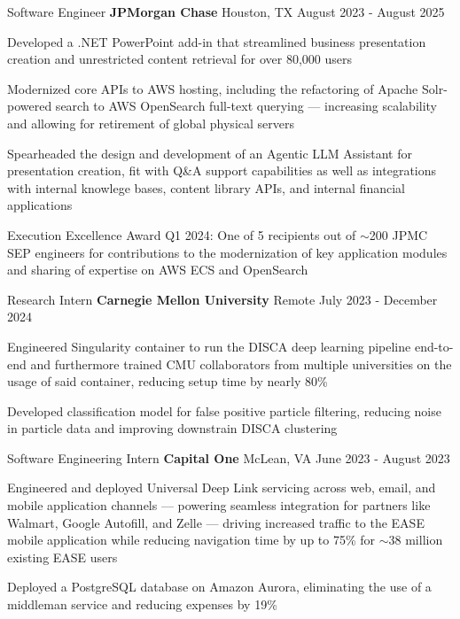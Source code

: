 
\begin{cventries}
  \cventry
    {Software Engineer}
    {\textbf{JPMorgan Chase}}
    {Houston, TX}
    {August 2023 - August 2025}
    {
      \begin{cvitems}
        \item{Developed a .NET PowerPoint add-in that streamlined business presentation creation and unrestricted content retrieval for over 80,000 users}
        \item{Modernized core APIs to AWS hosting, including the refactoring of Apache Solr-powered search to AWS OpenSearch full-text querying --- increasing scalability and allowing for retirement of global physical servers}
        \item{Spearheaded the design and development of an Agentic LLM Assistant for presentation creation, fit with Q\&A support capabilities as well as integrations with internal knowlege bases, content library APIs, and internal financial applications}
        \item{Execution Excellence Award Q1 2024: One of 5 recipients out of $\sim$200 JPMC SEP engineers for contributions to the modernization of key application modules and sharing of expertise on AWS ECS and OpenSearch}
      \end{cvitems}
    }

  \cventry
    {Research Intern}
    {\textbf{Carnegie Mellon University}}
    {Remote}
    {July 2023 - December 2024}
    {
      \begin{cvitems}
        \item{Engineered Singularity container to run the DISCA deep learning pipeline end-to-end and furthermore trained CMU collaborators from multiple universities on the usage of said container, reducing setup time by nearly 80\%}
        \item{Developed classification model for false positive particle filtering, reducing noise in particle data and improving downstrain DISCA clustering}
      \end{cvitems}
    }

  \cventry
    {Software Engineering Intern}
    {\textbf{Capital One}}
    {McLean, VA}
    {June 2023 - August 2023}
    {
      \begin{cvitems}
        \item{Engineered and deployed Universal Deep Link servicing across web, email, and mobile application channels --- powering seamless integration for partners like Walmart, Google Autofill, and Zelle --- driving increased traffic to the EASE mobile application while reducing navigation time by up to 75\% for $\sim$38 million existing EASE users}
        \item{Deployed a PostgreSQL database on Amazon Aurora, eliminating the use of a middleman service and reducing expenses by 19\%}
      \end{cvitems}
    }


\end{cventries}
